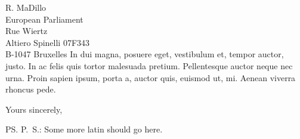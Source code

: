 \documentclass[a4paper,12pt]{letter}
\begin{document}
\begin{letter}{
	R. MaDillo\\
	European Parliament\\
	Rue Wiertz\\
	Altiero Spinelli 07F343\\
	B-1047 Bruxelles 
}
	In dui magna, posuere eget, vestibulum et, tempor auctor, justo. In ac felis 
	quis tortor malesuada pretium. Pellentesque auctor neque nec urna. Proin 
	sapien ipsum, porta a, auctor quis, euismod ut, mi. Aenean viverra rhoncus 
	pede. 

%
%

%
%
\closing{Yours sincerely,} %
\ps{P.\ S.: Some more latin should go here.} %

%
%

\vspace{1cm}
\begingroup
\def\enotesize{\small}
\def\enoteheading{\Large \textsc{Notes}}
\theendnotes
\endgroup
\end{letter}
\end{document}
